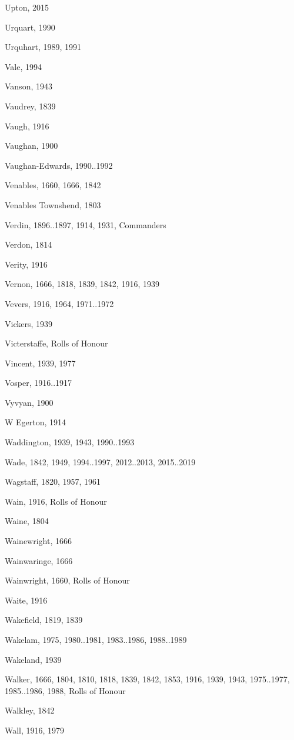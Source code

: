 \begin{theindex}
\item Upton, 2015
\item Urquart, 1990
\item Urquhart, 1989, 1991
\item Vale, 1994
\item Vanson, 1943
\item Vaudrey, 1839
\item Vaugh, 1916
\item Vaughan, 1900
\item Vaughan-Edwards, 1990..1992
\item Venables, 1660, 1666, 1842
\item Venables Townshend, 1803
\item Verdin, 1896..1897, 1914, 1931, Commanders
\item Verdon, 1814
\item Verity, 1916
\item Vernon, 1666, 1818, 1839, 1842, 1916, 1939
\item Vevers, 1916, 1964, 1971..1972
\item Vickers, 1939
\item Victerstaffe, Rolls of Honour
\item Vincent, 1939, 1977
\item Vosper, 1916..1917
\item Vyvyan, 1900
\item W Egerton, 1914
\item Waddington, 1939, 1943, 1990..1993
\item Wade, 1842, 1949, 1994..1997, 2012..2013, 2015..2019
\item Wagstaff, 1820, 1957, 1961
\item Wain, 1916, Rolls of Honour
\item Waine, 1804
\item Wainewright, 1666
\item Wainwaringe, 1666
\item Wainwright, 1660, Rolls of Honour
\item Waite, 1916
\item Wakefield, 1819, 1839
\item Wakelam, 1975, 1980..1981, 1983..1986, 1988..1989
\item Wakeland, 1939
\item Walker, 1666, 1804, 1810, 1818, 1839, 1842, 1853, 1916, 1939, 1943, 1975..1977, 1985..1986, 1988, Rolls of Honour
\item Walkley, 1842
\item Wall, 1916, 1979

\end{theindex}
